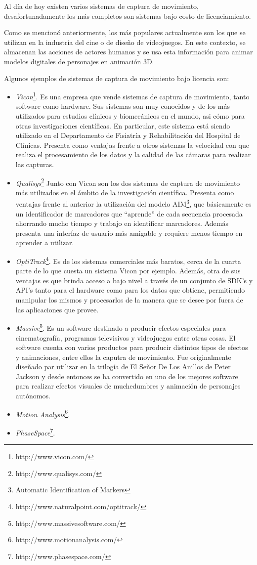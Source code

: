 Al día de hoy existen varios sistemas de captura de movimiento, desafortunadamente los más completos son sistemas bajo costo de licenciamiento. 

Como se mencionó anteriormente, los más populares actualmente son los que se utilizan en la industria del cine o de diseño de videojuegos. En este contexto, se almacenan las acciones de actores humanos y se usa esta información para animar modelos digitales de personajes en animación 3D.

Algunos ejemplos de sistemas de captura de movimiento bajo licencia son:

\begin{itemize}
\item \emph{Vicon}\footnote{http://www.vicon.com/}. Es una empresa que vende sistemas de captura de movimiento, tanto software como hardware. Sus sistemas son muy conocidos y de los más utilizados para estudios clínicos y biomecánicos en el mundo, asi cómo para otras investigaciones científicas. En particular, este sistema está siendo utilizado en el Departamento de Fisiatría y Rehabilitación del Hospital de Clínicas. Presenta como ventajas frente a otros sistemas la velocidad con que realiza el procesamiento de los datos y la calidad de las cámaras para realizar las capturas.
\item \emph{Qualisys}\footnote{http://www.qualisys.com/} Junto con Vicon son los dos sistemas de captura de movimiento más utilizados en el ámbito de la investigación científica. Presenta como ventajas frente al anterior la utilización del modelo AIM\footnote{Automatic Identification of Markers}, que básicamente es un identificador de marcadores que ``aprende'' de cada secuencia procesada ahorrando mucho tiempo y trabajo en identificar marcadores. Además presenta una interfaz de usuario más amigable y requiere menos tiempo en aprender a utilizar.
\item \emph{OptiTrack}\footnote{http://www.naturalpoint.com/optitrack/}. Es de los sistemas comerciales más baratos, cerca de la cuarta parte de lo que cuesta un sistema Vicon por ejemplo. Además, otra de sus ventajas es que brinda acceso a bajo nivel a través de un conjunto de  SDK's y API's tanto para el hardware como para los datos que obtiene, permitiendo manipular los mismos y procesarlos de la manera que se desee por fuera de las aplicaciones que provee. 
\item \emph{Massive}\footnote{http://www.massivesoftware.com/}. Es un software destinado a producir efectos especiales para cinematografía, programas televisivos y videojuegos entre otras cosas. El software cuenta con varios productos para producir distintos tipos de efectos y animaciones, entre ellos la caputra de movimiento. Fue originalmente diseñado par utilizar en la trilogía de El Señor De Los Anillos de Peter Jackson y desde entonces se ha convertido en uno de los mejores software para realizar efectos visuales de muchedumbres y animación de personajes autónomos.
\item \emph{Motion Analysis}\footnote{http://www.motionanalysis.com/}.
\item \emph{PhaseSpace}\footnote{http://www.phasespace.com/}.
\end{itemize}

